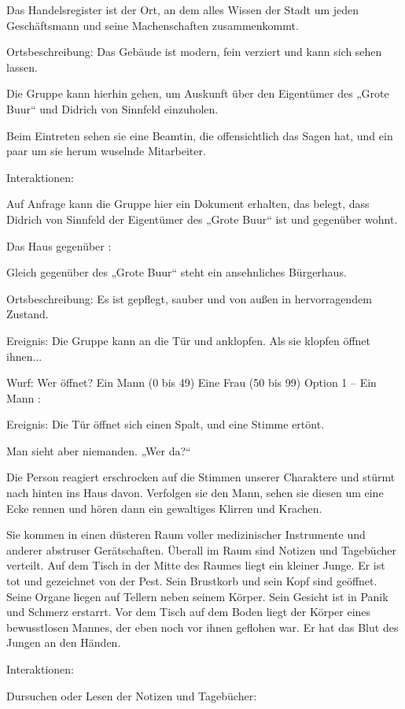 Das Handelsregister ist der Ort, an dem alles Wissen der Stadt um jeden Geschäftsmann und seine Machenschaften zusammenkommt.

Ortsbeschreibung: Das Gebäude ist modern, fein verziert und kann sich sehen lassen.

Die Gruppe kann hierhin gehen, um Auskunft über den Eigentümer des „Grote Buur“ und Didrich von Sinnfeld einzuholen.

Beim Eintreten sehen sie eine Beamtin, die offensichtlich das Sagen hat, und ein paar um sie herum wuselnde Mitarbeiter.

Interaktionen:

Auf Anfrage kann die Gruppe hier ein Dokument erhalten, das belegt, dass Didrich von Sinnfeld der Eigentümer des „Grote Buur“ ist und gegenüber wohnt.

Das Haus gegenüber
:

Gleich gegenüber des „Grote Buur“ steht ein ansehnliches Bürgerhaus.

Ortsbeschreibung: Es ist gepflegt, sauber und von außen in hervorragendem Zustand.

Ereignis: Die Gruppe kann an die Tür und anklopfen. Als sie klopfen öffnet ihnen...

Wurf: Wer öffnet?
Ein Mann (0 bis 49)
Eine Frau (50 bis 99)
Option 1 – Ein Mann
:

Ereignis: Die Tür öffnet sich einen Spalt, und eine Stimme ertönt.

Man sieht aber niemanden. „Wer da?“

Die Person reagiert erschrocken auf die Stimmen unserer Charaktere und stürmt nach hinten ins Haus davon. Verfolgen sie den Mann, sehen sie diesen um eine Ecke rennen und hören dann ein gewaltiges Klirren und Krachen.

Sie kommen in einen düsteren Raum voller medizinischer Instrumente und anderer abstruser Gerätschaften. Überall im Raum sind Notizen und Tagebücher verteilt. Auf dem Tisch in der Mitte des Raumes liegt ein kleiner Junge. Er ist tot und gezeichnet von der Pest. Sein Brustkorb und sein Kopf sind geöffnet. Seine Organe liegen auf Tellern neben seinem Körper. Sein Gesicht ist in Panik und Schmerz erstarrt. Vor dem Tisch auf dem Boden liegt der Körper eines bewusstlosen Mannes, der eben noch vor ihnen geflohen war. Er hat das Blut des Jungen an den Händen.

Interaktionen:

Dursuchen oder Lesen der Notizen und Tagebücher:

